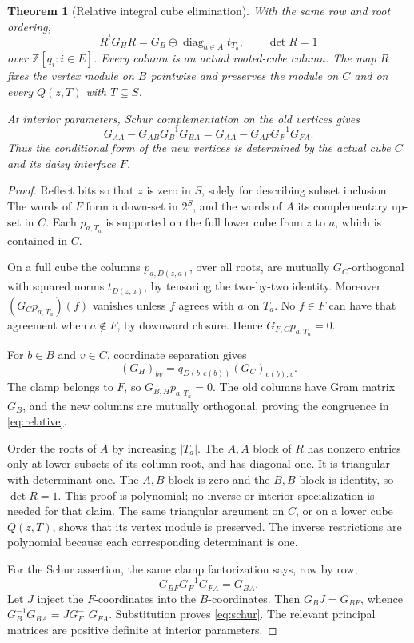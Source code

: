 \documentclass[11pt]{article}
\newtheorem{theorem}{Theorem}[section]
\theoremstyle{definition}
\begin{document}
\begin{theorem}[Relative integral cube elimination]\label{thm:relative}
With the same row and root ordering,
\begin{equation}\label{eq:relative}
 R^tG_HR=G_B\oplus\operatorname{diag}_{a\in A}t_{T_a},
 \qquad \det R=1
\end{equation}
over $\mathbb Z[q_i:i\in E]$. Every column is an actual rooted-cube
column. The map $R$ fixes the vertex module on $B$ pointwise and preserves
the module on $C$ and on every $Q(z,T)$ with $T\subseteq S$.

At interior parameters, Schur complementation on the old vertices gives
\begin{equation}\label{eq:schur}
 G_{AA}-G_{AB}G_B^{-1}G_{BA}
   =G_{AA}-G_{AF}G_F^{-1}G_{FA}.
\end{equation}
Thus the conditional form of the new vertices is determined by the actual
cube $C$ and its daisy interface $F$.
\end{theorem}
\begin{proof}
Reflect bits so that $z$ is zero in $S$, solely for describing subset
inclusion. The words of $F$ form a down-set in $2^S$, and the words of
$A$ its complementary up-set in $C$. Each $p_{a,T_a}$ is supported on
the full lower cube from $z$ to $a$, which is contained in $C$.

On a full cube the columns $p_{a,D(z,a)}$, over all roots, are mutually
$G_C$-orthogonal with squared norms $t_{D(z,a)}$, by tensoring the
two-by-two identity. Moreover $(G_Cp_{a,T_a})(f)$ vanishes unless $f$
agrees with $a$ on $T_a$. No $f\in F$ can have that agreement when
$a\notin F$, by downward closure. Hence $G_{F,C}p_{a,T_a}=0$.

For $b\in B$ and $v\in C$, coordinate separation gives
\[
 (G_H)_{bv}=q_{D(b,c(b))}(G_C)_{c(b),v}.
\]
The clamp belongs to $F$, so $G_{B,H}p_{a,T_a}=0$. The old columns
have Gram matrix $G_B$, and the new columns are mutually orthogonal,
proving the congruence in \eqref{eq:relative}.

Order the roots of $A$ by increasing $|T_a|$. The $A,A$ block of $R$
has nonzero entries only at lower subsets of its column root, and has
diagonal one. It is triangular with determinant one. The $A,B$ block
is zero and the $B,B$ block is identity, so $\det R=1$. This proof is
polynomial; no inverse or interior specialization is needed for that claim.
The same triangular argument on $C$, or on a lower cube $Q(z,T)$,
shows that its vertex module is preserved. The inverse restrictions are
polynomial because each corresponding determinant is one.

For the Schur assertion, the same clamp factorization says, row by row,
\[
 G_{BF}G_F^{-1}G_{FA}=G_{BA}.
\]
Let $J$ inject the $F$-coordinates into the $B$-coordinates. Then
$G_BJ=G_{BF}$, whence $G_B^{-1}G_{BA}=JG_F^{-1}G_{FA}$.
Substitution proves \eqref{eq:schur}. The relevant principal matrices
are positive definite at interior parameters.
\end{proof}
\end{document}
